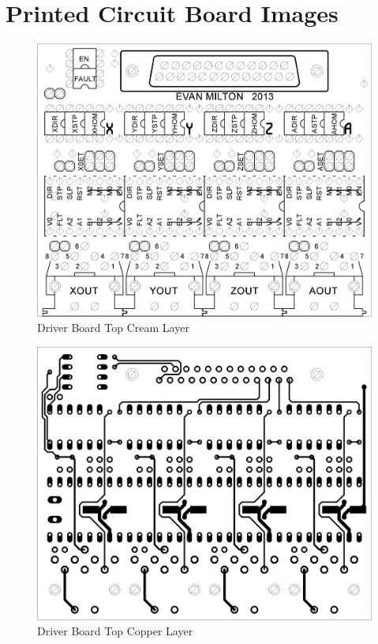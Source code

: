 \chapter{Printed Circuit Board Images}

\begin{figure}[h]
	\centering
	\includegraphics[width=1\textwidth]{pcb-design/topcream.png}
	\caption{Driver Board Top Cream Layer}
	\label{fig:driver-top-cream}
\end{figure}
\begin{figure}[h]
	\centering
	\includegraphics[width=1\textwidth]{pcb-design/toproute.png}
	\caption{Driver Board Top Copper Layer}
	\label{fig:driver-top-copper}
\end{figure}
